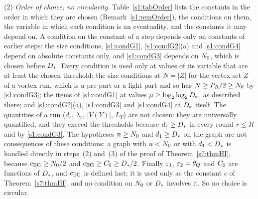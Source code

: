 \begin{condition}
(2) \emph{Order of choice; no circularity.} Table~\ref{s1:tabOrder} lists the
constants in the order in which they are chosen (Remark~\ref{s1:remOrder}), the
conditions on them, the variable in which each condition is an eventuality, and
the constants it may depend on. A condition on the constant of a step depends
only on constants of earlier steps: the size conditions, \ref{s1:condG1},
\ref{s1:condG2}(a) and \ref{s1:condG4} depend on absolute constants only, and
\ref{s1:condG3} depends on $N_{0}$, which is chosen before $D_{*}$. Every
condition is used only at values of its variable that are at least the chosen
threshold: the size conditions at $N=|Z|$ for the vertex set $Z$ of a vortex
run, which is a pre-part or a light part and so has $N\ge P_R/2\ge N_{0}$ by
\ref{s1:condG3}; the items of \ref{s1:condG1} at values
$\mu\ge\log_2\log_2D_{*}$, as described there; and \ref{s1:condG2}(a),
\ref{s1:condG3} and \ref{s1:condG4} at $D_{*}$ itself. The quantities of a
run ($d_r$, $\lambda_r$, $|V(Y)|$, $L_Y$) are not chosen: they are universally
quantified, and they exceed the thresholds because $d_r\ge D_{*}$ in every round
$r\le R$ and by \ref{s1:condG3}. The hypotheses $n\ge N_{0}$ and
$d_1\ge D_{*}$ on the graph are not consequences of these conditions: a graph
with $n<N_{0}$ or with $d_1<D_{*}$ is handled directly in steps~(2) and~(3) of
the proof of Theorem~\ref{s7:thmHI}, because $c_{\mathrm{EG}}\ge N_{0}/2$ and
$c_{\mathrm{EG}}\ge C_{0}\ge D_{*}/2$. Finally
$\varepsilon_{1}$, $\varepsilon_{2}=\theta_{Q}$ and $C_{0}$ are functions of $D_{*}$, and $c_{\mathrm{EG}}$
is defined last; it is used only as the constant $c$ of
Theorem~\ref{s7:thmHI}, and no condition on $N_{0}$ or $D_{*}$ involves it.
So no choice is circular.
\end{condition}

